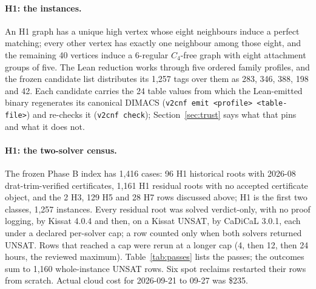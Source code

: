 \documentclass{anvil-paper}
\theoremstyle{definition}
\begin{document}
\paragraph{H1: the instances.} An H1 graph has a unique high vertex whose eight neighbours induce a perfect matching; every other vertex has exactly one neighbour among those eight, and the remaining 40 vertices induce a 6-regular $C_4$-free graph with eight attachment groups of five. The Lean reduction  works through five ordered family profiles, and the frozen candidate list distributes its 1,257 tags over them as 283, 346, 388, 198 and 42. Each candidate carries the 24 table values from which the Lean-emitted binary regenerates its canonical DIMACS (\texttt{v2cnf emit <profile> <table-file>}) and re-checks it (\texttt{v2cnf check}); Section~\ref{sec:trust} says what that pins and what it does not.

\paragraph{H1: the two-solver census.} The frozen Phase B index has 1,416 cases: 96 H1 historical roots with 2026-08 drat-trim-verified certificates, 1,161 H1 residual roots with no accepted certificate object, and the 2 H3, 129 H5 and 28 H7 rows discussed above; H1 is the first two classes, 1,257 instances. Every residual root was solved verdict-only, with no proof logging, by Kissat 4.0.4 and then, on a Kissat UNSAT, by CaDiCaL 3.0.1, each under a declared per-solver cap; a row counted only when both solvers returned UNSAT. Rows that reached a cap were rerun at a longer cap (4, then 12, then 24 hours, the reviewed maximum). Table~\ref{tab:passes} lists the passes; the outcomes sum to 1,160 whole-instance UNSAT rows. Six spot reclaims restarted their rows from scratch. Actual cloud cost for 2026-09-21 to 09-27 was \$235.
\end{document}
